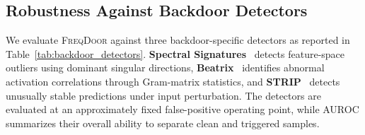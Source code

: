 \documentclass[lettersize,journal]{IEEEtran}
\begin{document}
\subsection{Robustness Against Backdoor Detectors}


We evaluate \textsc{FreqDoor} against three backdoor-specific detectors as reported in Table~\ref{tab:backdoor_detectors}. \textbf{Spectral Signatures}~\cite{Tran2018Spectral} detects feature-space outliers using dominant singular directions, \textbf{Beatrix}~\cite{Ma2023Beatrix} identifies abnormal activation correlations through Gram-matrix statistics, and \textbf{STRIP}~\cite{Gao2019STRIP} detects unusually stable predictions under input perturbation. The detectors are evaluated at an approximately fixed false-positive operating point, while AUROC summarizes their overall ability to separate clean and triggered samples.
\end{document}
